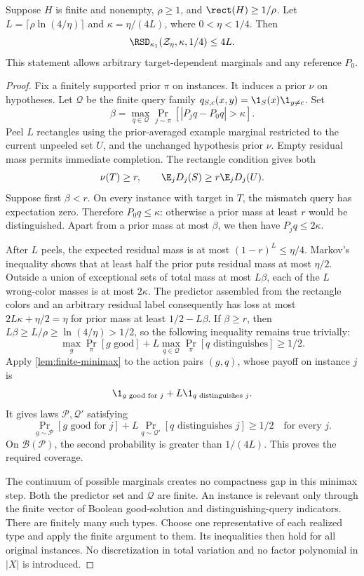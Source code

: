 \begin{theorem}\label{thm:rsd}
Suppose $H$ is finite and nonempty, $\rho\ge1$, and $\rect(H)\ge1/\rho$. Let $L=\lceil\rho\ln(4/\eta)\rceil$ and $\kappa=\eta/(4L)$, where $0<\eta<1/4$. Then
\[
 \RSD_{\kappa_1}(\mathcal Z_\eta,\kappa,1/4)\le4L.
\]
This statement allows arbitrary target-dependent marginals and any reference $P_0$.
\end{theorem}

\begin{proof}
Fix a finitely supported prior $\pi$ on instances. It induces a prior $\nu$ on hypotheses. Let $\mathcal Q$ be the finite query family $q_{S,c}(x,y)=\1_S(x)\1_{y\ne c}$. Set
\[
 \beta=\max_{q\in\mathcal Q}\Pr_{j\sim\pi}[|P_jq-P_0q|>\kappa].
\]
Peel $L$ rectangles using the prior-averaged example marginal restricted to the current unpeeled set $U$, and the unchanged hypothesis prior $\nu$. Empty residual mass permits immediate completion. The rectangle condition gives both
\[
 \nu(T)\ge r,\qquad \E_jD_j(S)\ge r\E_jD_j(U).
\]
Suppose first $\beta<r$. On every instance with target in $T$, the mismatch query has expectation zero. Therefore $P_0q\le\kappa$: otherwise a prior mass at least $r$ would be distinguished. Apart from a prior mass at most $\beta$, we then have $P_jq\le2\kappa$.

After $L$ peels, the expected residual mass is at most $(1-r)^L\le\eta/4$. Markov's inequality shows that at least half the prior puts residual mass at most $\eta/2$. Outside a union of exceptional sets of total mass at most $L\beta$, each of the $L$ wrong-color masses is at most $2\kappa$. The predictor assembled from the rectangle colors and an arbitrary residual label consequently has loss at most $2L\kappa+\eta/2=\eta$ for prior mass at least $1/2-L\beta$. If $\beta\ge r$, then $L\beta\ge L/\rho\ge\ln(4/\eta)>1/2$, so the following inequality remains true trivially:
\begin{equation}\label{eq:additive-game}
 \max_g\Pr_\pi[g\text{ good}]+L\max_{q\in\mathcal Q}\Pr_\pi[q\text{ distinguishes}]\ge1/2.
\end{equation}
Apply \cref{lem:finite-minimax} to the action pairs $(g,q)$, whose payoff on instance $j$ is
\[
 \1_{g\text{ good for }j}+L\1_{q\text{ distinguishes }j}.
\]
It gives laws $\mathcal P,\mathcal Q'$ satisfying
\[
 \Pr_{g\sim\mathcal P}[g\text{ good for }j]
 +L\Pr_{q\sim\mathcal Q'}[q\text{ distinguishes }j]\ge1/2
 \quad\text{for every }j.
\]
On $\mathcal B(\mathcal P)$, the second probability is greater than $1/(4L)$. This proves the required coverage.

The continuum of possible marginals creates no compactness gap in this minimax step. Both the predictor set and $\mathcal Q$ are finite. An instance is relevant only through the finite vector of Boolean good-solution and distinguishing-query indicators. There are finitely many such types. Choose one representative of each realized type and apply the finite argument to them. Its inequalities then hold for all original instances. No discretization in total variation and no factor polynomial in $|X|$ is introduced.
\end{proof}
